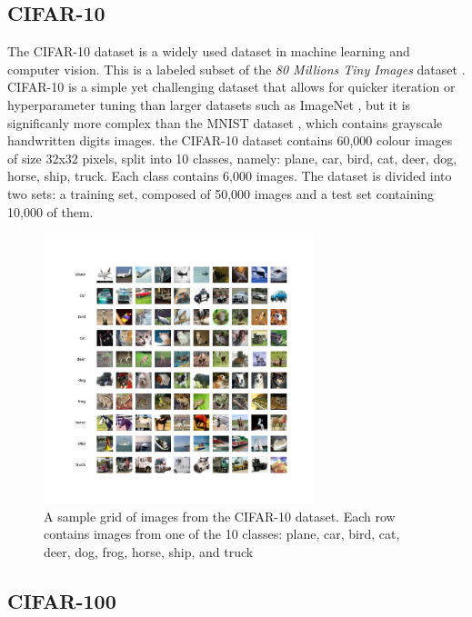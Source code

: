 \subsection{CIFAR-10}

The CIFAR-10 dataset \cite{CIFARdataset} is a widely
used dataset in machine learning and computer vision. This is a labeled subset
of the \emph{80 Millions Tiny Images} dataset \cite{4531741}. CIFAR-10 is a
simple yet challenging dataset that allows for quicker iteration or
hyperparameter tuning than larger datasets such as ImageNet
\cite{DBLP:journals/ijcv/RussakovskyDSKS15}, but it is significanly more complex
than the MNIST dataset \cite{6296535}, which contains grayscale handwritten
digits images. the CIFAR-10 dataset contains 60,000 colour images of size 32x32
pixels, split into 10 classes, namely: plane, car, bird, cat, deer, dog, horse,
ship, truck. Each class contains 6,000 images. The dataset is divided into two
sets: a training set, composed of 50,000 images and a test set containing 10,000
of them.\\

\begin{figure}[ht!]
  \centering
  \includegraphics[width=0.7\textwidth]{chapter_dlo/assets/cifar-10_example.png}
  \caption{ A sample grid of images from the CIFAR-10 dataset. Each row
    contains images from one of the 10 classes: plane, car, bird, cat,
    deer, dog, frog, horse, ship, and truck}
  \label{fig:intro:cifar10_examples}
\end{figure}


\subsection{CIFAR-100}

